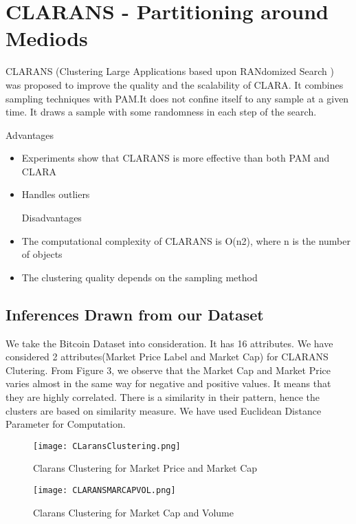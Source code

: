 \documentclass{article}
\begin{document}
\section{CLARANS - Partitioning around Mediods}

CLARANS (Clustering Large Applications based upon
RANdomized Search ) was proposed to improve the quality and the scalability of CLARA. It combines sampling techniques with PAM.It does not confine itself to any sample at a given time.
It draws a sample with some randomness in each step of the search. \newline

Advantages
\begin {itemize}
\item Experiments show that CLARANS is more effective than both PAM
and CLARA
\item Handles outliers 

Disadvantages
\item The computational complexity of CLARANS is O(n2), where n is the
number of objects
\item The clustering quality depends on the sampling method
\end{itemize}


\subsection{Inferences Drawn from our Dataset}
We take the Bitcoin Dataset into consideration. It has 16 attributes. We have considered 2 attributes(Market Price Label and Market Cap)  for CLARANS Clutering. From Figure 3, we observe that the Market Cap and Market Price varies almost in the same way for negative and positive values. It means that they are highly correlated. There is a similarity in their pattern, hence the clusters are based on similarity measure. We  have used Euclidean Distance Parameter for Computation. \newine

\begin{figure}[h]
    \centering
    \texttt{[image: CLaransClustering.png]}
    \caption{Clarans Clustering for Market Price and Market Cap }
    \label{fig:my_label}
\end{figure}



\begin{figure}[h]
    \centering
    \texttt{[image: CLARANSMARCAPVOL.png]}
    \caption{Clarans Clustering for Market Cap and Volume }
    \label{fig:my_label}
\end{figure}
\end{document}
